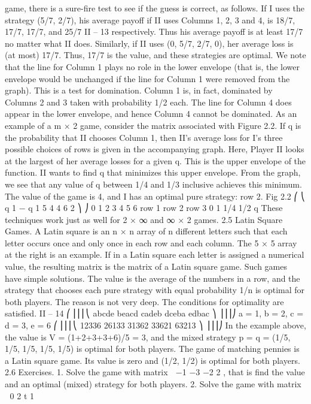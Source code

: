 game, there is a sure-fire test to see if the guess is correct, as follows. If I uses the strategy
(5/7, 2/7), his average payoff if II uses Columns 1, 2, 3 and 4, is 18/7, 17/7, 17/7, and 25/7
II – 13
respectively. Thus his average payoff is at least 17/7 no matter what II does. Similarly,
if II uses (0, 5/7, 2/7, 0), her average loss is (at most) 17/7. Thus, 17/7 is the value, and
these strategies are optimal.
We note that the line for Column 1 plays no role in the lower envelope (that is, the
lower envelope would be unchanged if the line for Column 1 were removed from the graph).
This is a test for domination. Column 1 is, in fact, dominated by Columns 2 and 3 taken
with probability 1/2 each. The line for Column 4 does appear in the lower envelope, and
hence Column 4 cannot be dominated.
As an example of a m × 2 game, consider the matrix associated with Figure 2.2. If
q is the probability that II chooses Column 1, then II’s average loss for I’s three possible
choices of rows is given in the accompanying graph. Here, Player II looks at the largest
of her average losses for a given q. This is the upper envelope of the function. II wants
to find q that minimizes this upper envelope. From the graph, we see that any value of q
between 1/4 and 1/3 inclusive achieves this minimum. The value of the game is 4, and I
has an optimal pure strategy: row 2.
Fig 2.2
⎛
⎝
q 1 − q
1 5
4 4
6 2
⎞
⎠
0
1
2
3
4
5
6
row 1
row 2
row 3
0 1 1/4 1/2
q
These techniques work just as well for 2 × ∞ and ∞ × 2 games.
2.5 Latin Square Games. A Latin square is an n × n array of n different letters
such that each letter occurs once and only once in each row and each column. The 5 × 5
array at the right is an example. If in a Latin square each letter is assigned a numerical
value, the resulting matrix is the matrix of a Latin square game. Such games have simple
solutions. The value is the average of the numbers in a row, and the strategy that chooses
each pure strategy with equal probability 1/n is optimal for both players. The reason is
not very deep. The conditions for optimality are satisfied.
II – 14
⎛
⎜⎜⎜⎝
abcde
beacd
cadeb
dceba
edbac
⎞
⎟⎟⎟⎠
a = 1, b = 2, c = d = 3, e = 6
⎛
⎜⎜⎜⎝
12336
26133
31362
33621
63213
⎞
⎟⎟⎟⎠
In the example above, the value is V = (1+2+3+3+6)/5 = 3, and the mixed strategy
p = q = (1/5, 1/5, 1/5, 1/5, 1/5) is optimal for both players. The game of matching pennies
is a Latin square game. Its value is zero and (1/2, 1/2) is optimal for both players.
2.6 Exercises.
1. Solve the game with matrix  −1 −3
−2 2
, that is find the value and an optimal
(mixed) strategy for both players.
2. Solve the game with matrix  0 2
t 1

